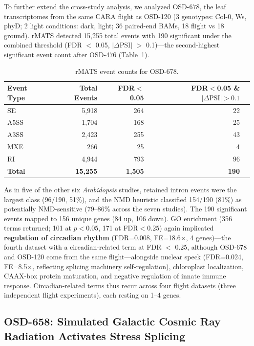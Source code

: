 \documentclass[12pt,a4paper]{article}
\begin{document}
To further extend the cross-study analysis, we analyzed OSD-678, the leaf transcriptomes from the same CARA flight as OSD-120 (3 genotypes: Col-0, Ws, phyD; 2 light conditions: dark, light; 36 paired-end BAMs, 18 flight vs 18 ground). rMATS detected 15,255 total events with 190 significant under the combined threshold (FDR $<$ 0.05, $|\Delta\text{PSI}|$ $>$ 0.1)---the second-highest significant event count after OSD-476 (Table~\ref{tab:osd678_events}).

\begin{table}[h]
\centering
\caption{rMATS event counts for OSD-678.}
\label{tab:osd678_events}
\begin{tabular}{lrrrr}
\toprule
Event Type & Total Events & FDR$<$0.05 & FDR$<$0.05 \& $|\Delta\text{PSI}|>0.1$ \\
\midrule
SE & 5,918 & 264 & 22 \\
A5SS & 1,704 & 168 & 25 \\
A3SS & 2,423 & 255 & 43 \\
MXE & 266 & 25 & 4 \\
RI & 4,944 & 793 & 96 \\
\textbf{Total} & \textbf{15,255} & \textbf{1,505} & \textbf{190} \\
\bottomrule
\end{tabular}
\end{table}

As in five of the other six \textit{Arabidopsis} studies, retained intron events were the largest class (96/190, 51\%), and the NMD heuristic classified 154/190 (81\%) as potentially NMD-sensitive (79--86\% across the seven studies). The 190 significant events mapped to 156 unique genes (84 up, 106 down). GO enrichment (356 terms returned; 101 at $p<0.05$, 171 at FDR$<0.25$) again implicated \textbf{regulation of circadian rhythm} (FDR=0.008, FE=18.6$\times$, 4 genes)---the fourth dataset with a circadian-related term at FDR $<$ 0.25, although OSD-678 and OSD-120 come from the same flight---alongside nuclear speck (FDR=0.024, FE=8.5$\times$, reflecting splicing machinery self-regulation), chloroplast localization, CAAX-box protein maturation, and negative regulation of innate immune response. Circadian-related terms thus recur across four flight datasets (three independent flight experiments), each resting on 1--4 genes.

\subsection{OSD-658: Simulated Galactic Cosmic Ray Radiation Activates Stress Splicing}
\end{document}
